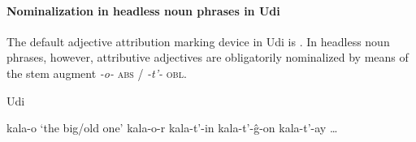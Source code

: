 \paragraph*{Nominalization in headless noun phrases in Udi}
The default adjective attribution marking device in Udi is . In headless noun phrases, however, attributive adjectives are obligatorily nominalized by means of the stem augment \textit{-o-} \textsc{abs} / \textit{-t'-} \textsc{obl}.
\begin{exe}
\settowidth{}
\ex \rm{Udi \citep[466]{schulze-furhoff1994}}
\begin{xlist}
\ex	kala-o		\rm{‘the big/old one’}	
\ex	kala-o-r						
\ex	kala-t'-in						
\ex	kala-t'-ĝ-on					
\ex	kala-t'-ay						
\ex \dots
\end{xlist}
\end{exe}

